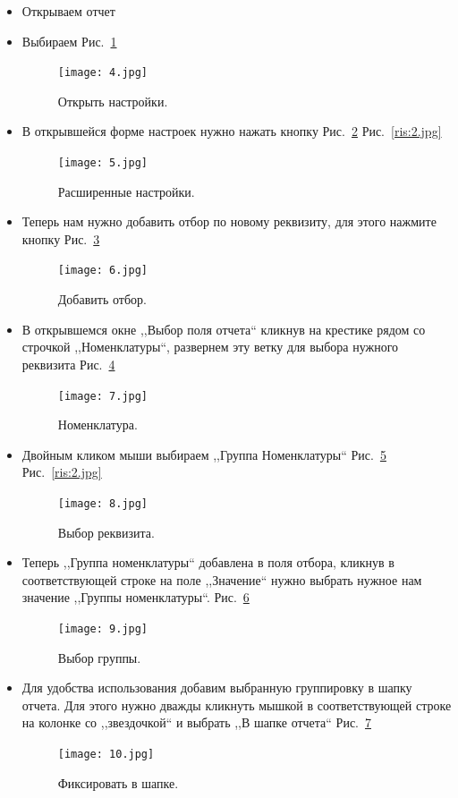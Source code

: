 \begin{itemize}	

	\item Открываем отчет
	\item Выбираем   Рис.~\ref{ris:4.jpg}	
	\begin{figure}[H]
		\texttt{[image: 4.jpg]}
		\caption{Открыть настройки.}
		\label{ris:4.jpg}
	\end{figure}
	\item	В открывшейся форме настроек нужно нажать кнопку   Рис.~\ref{ris:5.jpg}
	 Рис.~\ref{ris:2.jpg}	
	\begin{figure}[H]
		\texttt{[image: 5.jpg]}
		\caption{Расширенные настройки.}
		\label{ris:5.jpg}
	\end{figure} 
	\item	Теперь нам нужно добавить отбор по новому реквизиту, для этого нажмите кнопку 
 Рис.~\ref{ris:6.jpg}
	\begin{figure}[H]
		\texttt{[image: 6.jpg]}
		\caption{Добавить отбор.}
		\label{ris:6.jpg}
	\end{figure}



	\item В открывшемся окне ,,Выбор поля отчета`` кликнув на крестике рядом со строчкой ,,Номенклатуры``,
	развернем эту ветку для выбора нужного реквизита Рис.~\ref{ris:7.jpg}	
\begin{figure}[H]
	\texttt{[image: 7.jpg]}
	\caption{Номенклатура.}
	\label{ris:7.jpg}
\end{figure}
	\item	Двойным кликом мыши выбираем  ,,Группа Номенклатуры`` Рис.~\ref{ris:8.jpg}
Рис.~\ref{ris:2.jpg}	
\begin{figure}[H]
	\texttt{[image: 8.jpg]}
	\caption{Выбор реквизита.}
	\label{ris:8.jpg}
\end{figure} 
\item Теперь ,,Группа номенклатуры`` добавлена в поля отбора, кликнув в соответствующей строке на поле 
,,Значение`` нужно выбрать нужное нам значение ,,Группы номенклатуры``.
Рис.~\ref{ris:9.jpg}
\begin{figure}[H]
	\texttt{[image: 9.jpg]}
	\caption{Выбор группы.}
	\label{ris:9.jpg}
\end{figure}

\item Для удобства использования добавим выбранную группировку в шапку отчета. Для этого нужно дважды кликнуть мышкой в соответствующей строке на колонке со  ,,звездочкой`` и выбрать ,,В шапке отчета``
Рис.~\ref{ris:10.jpg}
\begin{figure}[H]
	\texttt{[image: 10.jpg]}
	\caption{Фиксировать в шапке.}
	\label{ris:10.jpg}
\end{figure}



\end{itemize}
